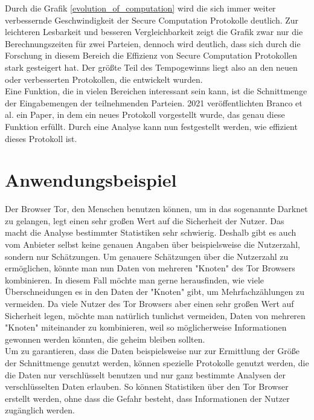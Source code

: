 Durch die Grafik \ref{evolution_of_computation} wird die sich immer weiter verbessernde Geschwindigkeit der Secure Computation Protokolle deutlich. Zur leichteren Lesbarkeit und besseren Vergleichbarkeit zeigt die Grafik zwar nur die Berechnungszeiten für zwei Parteien, dennoch wird deutlich, dass sich durch die Forschung in diesem Bereich die Effizienz von Secure Computation Protokollen stark gesteigert hat.
Der größte Teil des Tempogewinns liegt also an den neuen oder verbesserten Protokollen, die entwickelt wurden.\\
Eine Funktion, die in vielen Bereichen interessant sein kann, ist die Schnittmenge der Eingabemengen der teilnehmenden Parteien. 2021 veröffentlichten Branco et al. \cite{Doettling2021} ein Paper, in dem ein neues Protokoll vorgestellt wurde, das genau diese Funktion erfüllt. Durch eine Analyse kann nun festgestellt werden, wie effizient dieses Protokoll ist.

\section{Anwendungsbeispiel}
Der Browser Tor, den Menschen benutzen können, um in das sogenannte Darknet zu gelangen, legt einen sehr großen Wert auf die Sicherheit der Nutzer. Das macht die Analyse bestimmter Statistiken sehr schwierig. Deshalb gibt es auch vom Anbieter selbst keine genauen Angaben über beispielsweise die Nutzerzahl, sondern nur Schätzungen. Um genauere Schätzungen über die Nutzerzahl zu ermöglichen, könnte man nun Daten von mehreren "Knoten" des Tor Browsers kombinieren. In diesem Fall möchte man gerne herausfinden, wie viele Überschneidungen es in den Daten der "Knoten" gibt, um Mehrfachzählungen zu vermeiden. Da viele Nutzer des Tor Browsers aber einen sehr großen Wert auf Sicherheit legen, möchte man natürlich tunlichst vermeiden, Daten von mehreren "Knoten" miteinander zu kombinieren, weil so möglicherweise Informationen gewonnen werden könnten, die geheim bleiben sollten.\\
Um zu garantieren, dass die Daten beispielsweise nur zur Ermittlung der Größe der Schnittmenge genutzt werden, können spezielle Protokolle genutzt werden, die die Daten nur verschlüsselt benutzen und nur ganz bestimmte  Analysen der verschlüsselten Daten erlauben. So können Statistiken über den Tor Browser erstellt werden, ohne dass die Gefahr besteht, dass Informationen der Nutzer zugänglich werden.

